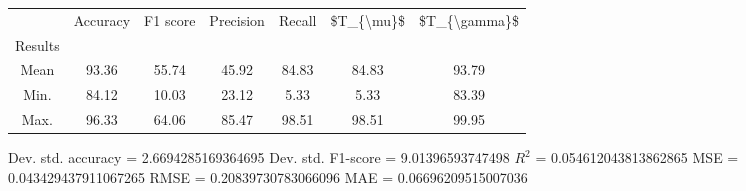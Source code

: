 \begin{tabular}{|c|c|c|c|c|c|c|}
\toprule
{} &  Accuracy &  F1 score &  Precision &  Recall &  \$T\_\{\textbackslash mu\}\$ &  \$T\_\{\textbackslash gamma\}\$ \\
Results &           &           &            &         &            &               \\
\hline
Mean    &     93.36 &     55.74 &      45.92 &   84.83 &      84.83 &         93.79 \\
Min.    &     84.12 &     10.03 &      23.12 &    5.33 &       5.33 &         83.39 \\
Max.    &     96.33 &     64.06 &      85.47 &   98.51 &      98.51 &         99.95 \\
\bottomrule
\end{tabular}

 Dev. std. accuracy = 2.6694285169364695
 Dev. std. F1-score = 9.01396593747498
 $R^2$ = 0.054612043813862865
 MSE = 0.043429437911067265
 RMSE = 0.20839730783066096
 MAE = 0.06696209515007036